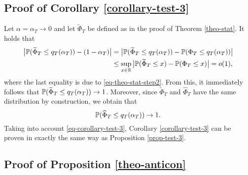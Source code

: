 \subsection*{Proof of Corollary \ref{corollary-test-3}}


Let $\alpha = \alpha_T \rightarrow 0$ and let $\widetilde{\Phi}_T$ be defined as in the proof of Theorem \ref{theo-stat}. It holds that 
\begin{align*} 
\big| \mathbb{P}(\widetilde{\Phi}_T \le q_T(\alpha_T)) - (1-\alpha_T) \big| 
 & = \big| \mathbb{P}(\widetilde{\Phi}_T \le q_T(\alpha_T)) - \mathbb{P}(\Phi_T \le q_T(\alpha_T)) \big| \\*
 & \le \sup_{x \in \mathbb{R}} \big| \mathbb{P}(\widetilde{\Phi}_T \le x) - \mathbb{P}(\Phi_T \le x) \big| = o(1), 
\end{align*}
where the last equality is due to \eqref{eq-theo-stat-step2}. From this, it immediately follows that $\mathbb{P}(\widetilde{\Phi}_T \le q_T(\alpha_T)) \rightarrow 1$. Moreover, since $\widetilde{\Phi}_T$ and $\widehat{\Phi}_T$ have the same distribution by construction, we obtain that 
\begin{equation}\label{eq-corollary-test-3}
\mathbb{P}(\widehat{\Phi}_T \le q_T(\alpha_T)) \rightarrow 1. 
\end{equation}
Taking into account \eqref{eq-corollary-test-3}, Corollary \ref{corollary-test-3} can be proven in exactly the same way as Proposition \ref{prop-test-3}. 



\subsection*{Proof of Proposition \ref{theo-anticon}}

